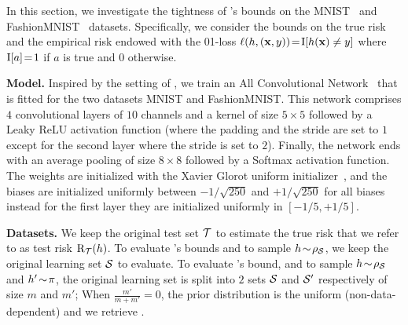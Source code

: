 \documentclass[twoside]{article}
\theoremstyle{plain}
\begin{document}
In this section, we investigate the tightness of 's bounds on the MNIST~\citep{lecun1998mnist} and FashionMNIST~\citep{xiao2017fashion} datasets. 
Specifically, we consider the bounds on the true risk and the empirical risk endowed with the 01-loss $\loss(h,(\xbf,y))\!=\!\indic[h(\xbf) \ne y]$ where $\indic[a]\!=\!1$ if $a$ is true and $0$ otherwise.

\textbf{Model.} 
Inspired by the setting of \citet{viallard2024general}, we train an All Convolutional Network~\citep{springenberg2015striving} that is fitted for the two datasets MNIST and FashionMNIST.
This network comprises $4$ convolutional layers of $10$ channels and a kernel of size $5{\times}5$ followed by a Leaky ReLU activation function (where the padding and the stride are set to $1$ except for the second layer where the stride is set to $2$). 
Finally, the network ends with an average pooling of size $8{\times}8$ followed by a Softmax activation function.
The weights are initialized with the Xavier Glorot uniform initializer~\citep{glorot2010understanding}, and the biases are initialized uniformly between $-1/\sqrt{250}$ and $+1/\sqrt{250}$ for all biases instead for the first layer they are initialized uniformly in $[-1/5, +1/5]$.

\textbf{Datasets.}
We keep the original test set $\Tcal$ to estimate the true risk that we refer to as test risk $\Risk_{\Tcal}(h)$.
To evaluate 's bounds and to sample $h\!\sim\!\AQ$, 
we keep the original learning set $\Scal$ to evaluate.
To evaluate 's bound, and to sample $h\!\sim\!\AQ$ and $h'\!\sim\!\P$, 
the original learning set is split into $2$ sets $\Scal$ and $\Scal'$ respectively of size $m$ and $m'$; 
When $\frac{m'}{m+m'}{=}0$, the prior distribution is the uniform (non-data-dependent) and we retrieve .
\end{document}

